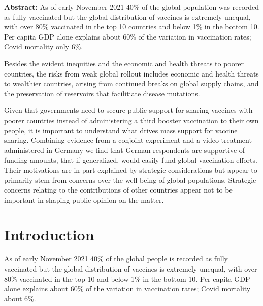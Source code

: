 \documentclass[12pt,oneside,smallheadings,chapterprefix=true]{article}
\begin{document}
\singlespacing
\begin{sloppypar}
\textbf{Abstract:} 
As of early November 2021 40\% of the global population was recorded as fully vaccinated but the global distribution of vaccines is extremely unequal, with over 80\% vaccinated in the top 10 countries and below 1\% in the bottom 10. Per capita GDP alone explains about 60\% of the variation in vaccination rates; Covid mortality only 6\%.

Besides the evident inequities and the economic and health threats to poorer countries, the risks from weak global rollout includes economic and health threats to wealthier countries, arising from continued breaks on global supply chains, and the preservation of reservoirs that facilitiate disease mutations.  

Given that governments need to secure public support for sharing vaccines with poorer countries instead of administering a third booster vaccination to their own people, it is important to understand what drives mass support for vaccine sharing. Combining evidence from a conjoint experiment  and a video treatment administered in Germany we find that German respondents are supportive of funding amounts, that if generalized, would easily fund global vaccination efforts. Their motivations are in part explained by strategic considerations but appear to primarily stem from concerns over the well being of global populations. Strategic concerns relating to the contributions of other countries appear not to be important in shaping public opinion on the matter. 

\end{sloppypar}






\thispagestyle{empty}

\newpage
\doublespacing

\setcounter{page}{1}

\section*{Introduction}

As of early November 2021 40\% of the global people is recorded as fully vaccinated but the global distribution of vaccines is extremely unequal, with over 80\% vaccinated in the top 10 and below 1\% in the bottom 10. Per capita GDP alone explains about 60\% of the variation in vaccination rates; Covid mortality about 6\%.
\end{document}

